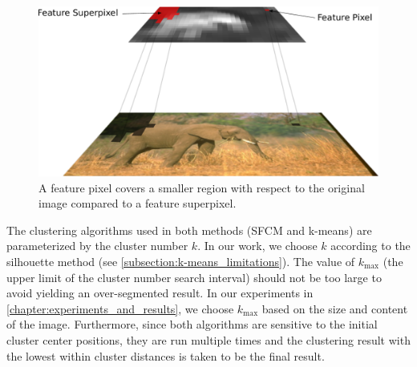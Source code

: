 \begin{figure}[!h]
    \centering
    \includegraphics[width=.65\textwidth]{figures/receptive_fields.pdf}
    \caption{A feature pixel covers a smaller region with respect to the original image compared to a feature superpixel.}
    \label{fig:receptive_fields}
\end{figure}

The clustering algorithms used in both methods (SFCM and k-means) are parameterized by the cluster number $k$. In our work, we choose $k$ according to the silhouette method (see \autoref{subsection:k-means_limitations}). The value of $k_{\text{max}}$ (the upper limit of the cluster number search interval) should not be too large to avoid yielding an over-segmented result. In our experiments in \autoref{chapter:experiments_and_results}, we choose $k_{\text{max}}$ based on the size and content of the image. Furthermore, since both algorithms are sensitive to the initial cluster center positions, they are run multiple times and the clustering result with the lowest within cluster distances is taken to be the final result.